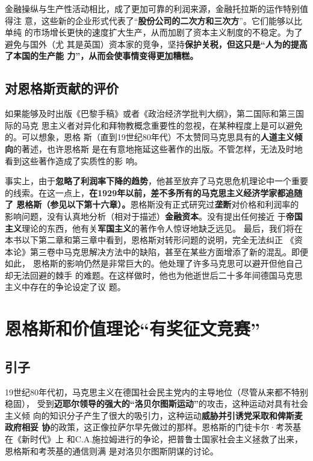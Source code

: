 金融操纵与生产性活动相比，成了更加可靠的利润来源，金融托拉斯的运作特别值得注
意，这些新的企业形式代表了“\textbf{股份公司的二次方和三次方}”。它们能够以比单纯
的市场增长更快的速度扩大生产，从而加剧了资本主义制度的不稳定。为了避免与国外（尤
其是英国）资本家的竞争，坚持\textbf{保护关税，但这只是“人为的提高了本国的生产能
  力”，从而会使事情变得更加糟糕。}

\section{对恩格斯贡献的评价}
如果能够及时出版《巴黎手稿》或者《政治经济学批判大纲》，第二国际和第三国际的马克
思主义者对异化和拜物教概念重要性的忽视，在某种程度上是可以避免的。可以想象，恩格
斯（直到19世纪80年代）不太赞同马克思具有的\textbf{人道主义倾向}的著述，也许恩格斯
是在有意地拖延这些著作的出版。不管怎样，无法及时地看到这些著作造成了实质性的影
响。

事实上，由于\textbf{忽略了利润率下降的趋势}，他甚至放弃了马克思危机理论中一个重要
的线索。在这一点上，\textbf{在1929年以前，差不多所有的马克思主义经济学家都追随了
  恩格斯（参见以下第十六章）。}恩格斯没有正式研究过\textbf{垄断}对价格和利润率的
影响问题，没有认真地分析（相对于描述）\textbf{金融资本}。没有提出任何接近
于\textbf{帝国主义}理论的东西，他有关\textbf{军国主义}的著作令人惊讶地缺乏远见。
最后，我们将在本书以下第二章和第三章中看到，恩格斯对转形问题的说明，完全无法纠正
《资本论》第三卷中马克思解决方法中的缺陷，甚至在某些方面增添了新的混乱。即便如此，
恩格斯的影响仍然是非常巨大的。他处理了许多马克思可以避开但他自己却无法回避的棘手
的难题。在这样做时，他也为他逝世后二十多年间德国马克思主义中存在的争论设定了议
题。

\chapter{恩格斯和价值理论“有奖征文竞赛”}
\label{chap:jingsai}

\section{引子}
19世纪80年代初，马克思主义在德国社会民主党内的主导地位（尽管从来都不特别稳固），
受到\textbf{迈耶尔领导的强大的“洛贝尔图斯运动”}的攻击，这种运动对具有社会主义倾
向的知识分子产生了很大的吸引力，这种运动\textbf{威胁并引诱党采取和俾斯麦政府相妥
  协}的政策，这正像拉萨尔早先做过的那样。恩格斯的门徒卡尔·考茨基在《新时代》上
和C.A.施拉姆进行的争论，把普鲁士国家社会主义拯救了出来，恩格斯和考茨基的通信则满
是对洛贝尔图斯阴谋的讨论。

